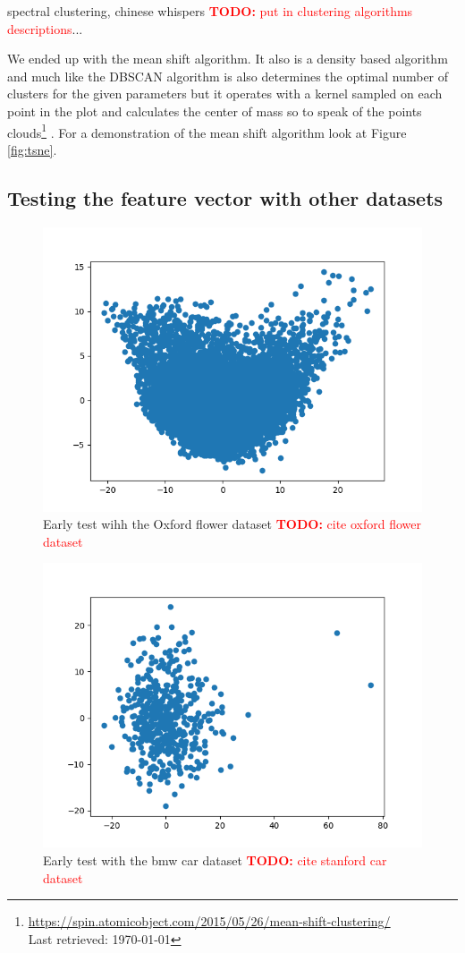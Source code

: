 \documentclass[journal]{vgtc}       %
\newcommand{\todo}[1]{\textcolor{red}{\textbf{TODO:} #1}}
\begin{document}
spectral clustering, chinese whispers  \todo{put in clustering algorithms descriptions}... 

We ended up with the mean shift algorithm. It also is a density based algorithm and much like the DBSCAN algorithm is also determines the optimal number of clusters for the given parameters but it operates with a kernel sampled on each point in the plot and calculates the center of mass so to speak of the points clouds\footnote{\url{https://spin.atomicobject.com/2015/05/26/mean-shift-clustering/}\\ Last retrieved: \today} . For a demonstration of the mean shift algorithm look at Figure \ref{fig:tsne}. 




\subsection{Testing the feature vector with other datasets}
\begin{figure}[tb]
	\begin{center}
		\includegraphics[width=.75\linewidth]{Figure1.png}
	\end{center}
	\caption{\label{fig:lorem} Early test wihh the Oxford flower dataset \todo{cite oxford flower dataset}}
\end{figure} 
\begin{figure}[tb]
	\begin{center}
		\includegraphics[width=.75\linewidth]{Figure2.png}
	\end{center}
	\caption{\label{fig:bmw} Early test with the bmw car dataset \todo{cite stanford car dataset}\cite{stanfordcar}}
\end{figure}
\end{document}
